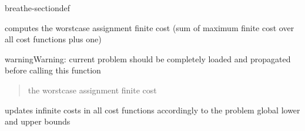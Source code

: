 \documentclass[letterpaper,10pt,openany,oneside,english]{sphinxmanual}
\begin{document}
\begin{fulllineitems}
\begin{sphinxuseclass}{breathe-sectiondef}
\begin{fulllineitems}
\end{fulllineitems}


\begin{fulllineitems}
\label{\detokenize{ref/ref_cpp:_CPPv4NK11WeightedCSP8finiteUbEv}}\label{\detokenize{ref/ref_cpp:_CPPv3NK11WeightedCSP8finiteUbEv}}\label{\detokenize{ref/ref_cpp:_CPPv2NK11WeightedCSP8finiteUbEv}}\label{\detokenize{ref/ref_cpp:WeightedCSP::finiteUbC}}
\pysigstartsignatures
\pysigstartmultiline
{}
\pysigstopmultiline
\pysigstopsignatures
\sphinxAtStartPar
computes the worst\sphinxhyphen{}case assignment finite cost (sum of maximum finite cost over all cost functions plus one) 

\begin{sphinxadmonition}{warning}{Warning:}
\sphinxAtStartPar
current problem should be completely loaded and propagated before calling this function 
\end{sphinxadmonition}
\begin{quote}\begin{description}
\sphinxAtStartPar
the worst\sphinxhyphen{}case assignment finite cost 

\end{description}\end{quote}

\end{fulllineitems}


\begin{fulllineitems}
\label{\detokenize{ref/ref_cpp:_CPPv4N11WeightedCSP15setInfiniteCostEv}}\label{\detokenize{ref/ref_cpp:_CPPv3N11WeightedCSP15setInfiniteCostEv}}\label{\detokenize{ref/ref_cpp:_CPPv2N11WeightedCSP15setInfiniteCostEv}}\label{\detokenize{ref/ref_cpp:WeightedCSP::setInfiniteCost}}
\pysigstartsignatures
\pysigstartmultiline
{}
\pysigstopmultiline
\pysigstopsignatures
\sphinxAtStartPar
updates infinite costs in all cost functions accordingly to the problem global lower and upper bounds 


\end{fulllineitems}
\end{sphinxuseclass}
\end{fulllineitems}
\end{document}
